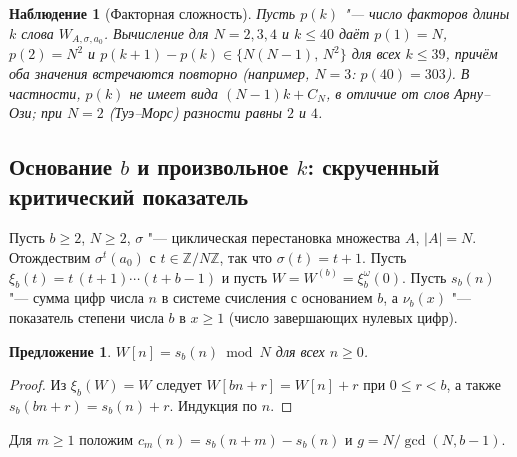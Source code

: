 \documentclass[a4paper,14pt]{extreport}
\theoremstyle{plain}
\newtheorem{proposition}[theorem]{Предложение}
\newtheorem{observation}[theorem]{Наблюдение}
\theoremstyle{definition}
\theoremstyle{remark}
\begin{document}
\begin{observation}[Факторная сложность]
	Пусть $p(k)$ "--- число факторов длины $k$ слова $W_{A,\sigma,a_0}$. Вычисление для $N=2,3,4$ и $k\le40$ даёт $p(1)=N$, $p(2)=N^2$ и
	$p(k+1)-p(k)\in\{N(N-1),\,N^2\}$ для всех $k\le39$, причём оба значения встречаются повторно (например, $N=3$: $p(40)=303$).
	В частности, $p(k)$ не имеет вида $(N-1)k+C_N$, в отличие от слов Арну--Ози; при $N=2$ (Туэ--Морс) разности равны $2$ и $4$.
\end{observation}
\subsection{Основание $b$ и произвольное $k$: скрученный критический показатель}\label{sec:twistedk}

Пусть $b\ge2$, $N\ge2$, $\sigma$ "--- циклическая перестановка множества $A$, $|A|=N$. Отождествим
$\sigma^t(a_0)$ с $t\in\mathbb Z/N\mathbb Z$, так что $\sigma(t)=t+1$. Пусть
$\xi_b(t)=t\,(t+1)\cdots(t+b-1)$ и пусть $W=W^{(b)}=\xi_b^\omega(0)$. Пусть $s_b(n)$ "--- сумма
цифр числа $n$ в системе счисления с основанием $b$, а $\nu_b(x)$ "--- показатель степени числа $b$ в $x\ge1$ (число завершающих нулевых цифр).

\begin{proposition}\label{tw:gTM}
	$W[n]=s_b(n)\bmod N$ для всех $n\ge0$.
\end{proposition}
\begin{proof}
	Из $\xi_b(W)=W$ следует $W[bn+r]=W[n]+r$ при $0\le r<b$, а также $s_b(bn+r)=s_b(n)+r$.
	Индукция по $n$.
\end{proof}

Для $m\ge1$ положим $c_m(n)=s_b(n+m)-s_b(n)$ и $g=N/\gcd(N,b-1)$.
\end{document}
